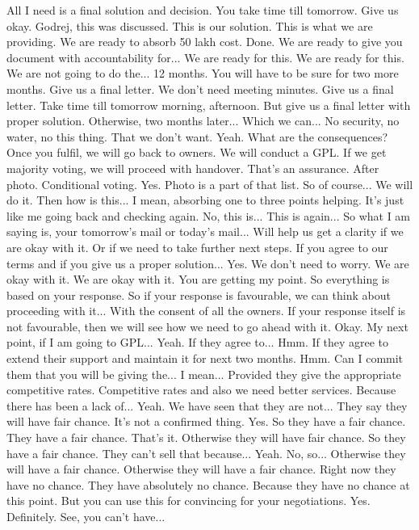 All I need is a final solution and decision.
You take time till tomorrow.
Give us okay.
Godrej, this was discussed.
This is our solution.
This is what we are providing.
We are ready to absorb 50 lakh cost.
Done.
We are ready to give you document with accountability for...
We are ready for this.
We are ready for this.
We are not going to do the...
12 months.
You will have to be sure for two more months.
Give us a final letter.
We don't need meeting minutes.
Give us a final letter.
Take time till tomorrow morning, afternoon.
But give us a final letter with proper solution.
Otherwise, two months later...
Which we can...
No security, no water, no this thing.
That we don't want.
Yeah.
What are the consequences?
Once you fulfil, we will go back to owners.
We will conduct a GPL.
If we get majority voting, we will proceed with handover.
That's an assurance.
After photo.
Conditional voting.
Yes.
Photo is a part of that list.
So of course...
We will do it.
Then how is this...
I mean, absorbing one to three points helping.
It's just like me going back and checking again.
No, this is...
This is again...
So what I am saying is, your tomorrow's mail or today's mail...
Will help us get a clarity if we are okay with it.
Or if we need to take further next steps.
If you agree to our terms and if you give us a proper solution...
Yes.
We don't need to worry.
We are okay with it.
We are okay with it.
You are getting my point.
So everything is based on your response.
So if your response is favourable, we can think about proceeding with it...
With the consent of all the owners.
If your response itself is not favourable, then we will see how we need to go ahead with it.
Okay.
My next point, if I am going to GPL...
Yeah.
If they agree to...
Hmm.
If they agree to extend their support and maintain it for next two months.
Hmm.
Can I commit them that you will be giving the...
I mean...
Provided they give the appropriate competitive rates.
Competitive rates and also we need better services.
Because there has been a lack of...
Yeah.
We have seen that they are not...
They say they will have fair chance.
It's not a confirmed thing.
Yes.
So they have a fair chance.
They have a fair chance.
That's it.
Otherwise they will have fair chance.
So they have a fair chance.
They can't sell that because...
Yeah.
No, so...
Otherwise they will have a fair chance.
Otherwise they will have a fair chance.
Right now they have no chance.
They have absolutely no chance.
Because they have no chance at this point.
But you can use this for convincing for your negotiations.
Yes.
Definitely.
See, you can't have...
